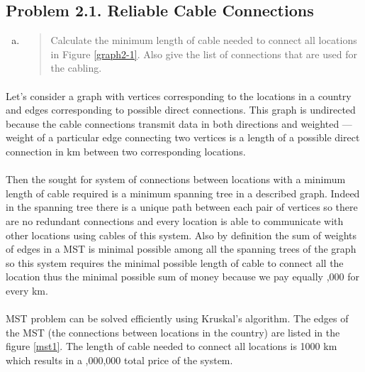 \subsection{Problem 2.1. Reliable Cable Connections}
\begin{enumerate}[(a)]
\item \begin{quote}Calculate the minimum length of cable needed to connect all locations in Figure
\ref{graph2-1}. Also give the list of connections that are used for the cabling.\end{quote}
\end{enumerate}

\paragraph{}
	Let's consider a graph with vertices corresponding to the locations in a country and edges corresponding to possible direct connections. This graph is undirected because the cable connections transmit data in both directions and weighted --- weight of a particular edge connecting two vertices is a length of a possible direct connection in km between two corresponding locations.

\paragraph{}
	Then the sought for system of connections between locations with a minimum length of cable required is a minimum spanning tree in a described graph. Indeed in the spanning tree there is a unique path between each pair of vertices so there are no redundant connections and every location is able to communicate with other locations using cables of this system. Also by definition the sum of weights of edges in a MST is minimal possible among all the spanning trees of the graph so this system requires the minimal possible length of cable to connect all the location thus the minimal possible sum of money because we pay equally ,000 for every km.

\paragraph{}
	MST problem can be solved efficiently using Kruskal's algorithm. The edges of the MST (the connections between locations in the country) are listed in the figure \ref{mst1}. The length of cable needed to connect all locations is 1000 km which results in a ,000,000 total price of the system.

